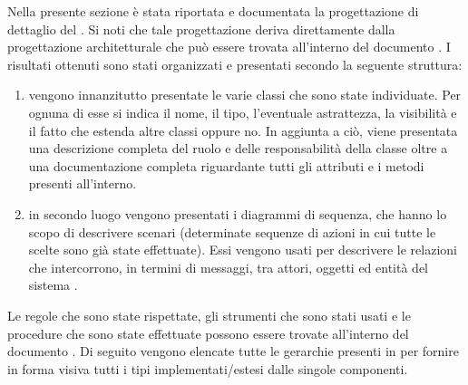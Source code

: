         Nella presente sezione è stata riportata e documentata la progettazione di dettaglio del  . Si noti che tale progettazione deriva direttamente dalla progettazione architetturale che può essere trovata all'interno del documento . I risultati ottenuti sono stati organizzati e presentati secondo la seguente struttura:
        \begin{enumerate}
            \item vengono innanzitutto presentate le varie classi che sono state individuate. Per ognuna di esse si indica il nome, il tipo, l'eventuale astrattezza, la visibilità e il fatto che estenda altre classi oppure no. In aggiunta a ciò, viene presentata una descrizione completa del ruolo e delle responsabilità della classe oltre a una documentazione completa riguardante tutti gli attributi e i metodi presenti all'interno.
            \item in secondo luogo vengono presentati i diagrammi di sequenza, che hanno lo scopo di descrivere scenari (determinate sequenze di azioni in cui tutte le scelte sono già state effettuate). Essi vengono usati per descrivere le relazioni che intercorrono, in termini di messaggi, tra attori, oggetti ed entità del sistema .
        \end{enumerate}
        Le regole che sono state rispettate, gli strumenti che sono stati usati e le procedure che sono state effettuate possono essere trovate all'interno del documento .
            Di seguito vengono elencate tutte le gerarchie presenti in  per fornire in forma visiva tutti i tipi implementati/estesi dalle singole componenti.
